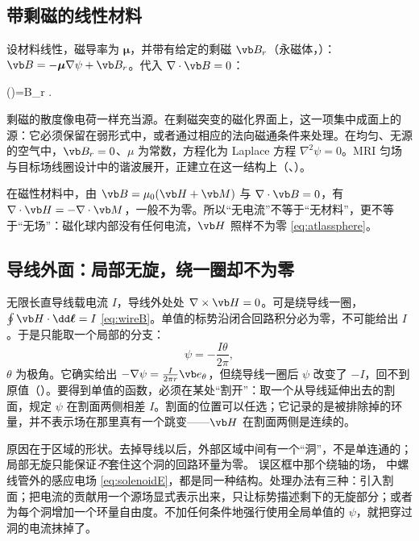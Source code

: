 \subsection{带剩磁的线性材料}
设材料线性，磁导率为 $\boldsymbol\mu$，并带有给定的剩磁 $\vb B_r$（永磁体，）：$\vb B=-\boldsymbol\mu\nabla\psi+\vb B_r$。代入 $\nabla\cdot\vb B=0$：
\begin{keyeq}
\nabla\cdot(\boldsymbol\mu\nabla\psi)=\nabla\cdot\vb B_r .
\label{eq:magscalar}
\end{keyeq}
剩磁的散度像电荷一样充当源。在剩磁突变的磁化界面上，这一项集中成面上的源：它必须保留在弱形式中，或者通过相应的法向磁通条件来处理。在均匀、无源的空气中，$\vb B_r=0$、$\mu$ 为常数，方程化为 Laplace 方程 $\nabla^2\psi=0$。MRI 匀场与目标场线圈设计中的谐波展开，正建立在这一结构上（、）。

在磁性材料中，由 $\vb B=\mu_0(\vb H+\vb M)$ 与 $\nabla\cdot\vb B=0$，有 $\nabla\cdot\vb H=-\nabla\cdot\vb M$，一般不为零。所以“无电流”不等于“无材料”，更不等于“无场”：磁化球内部没有任何电流，$\vb H$ 照样不为零 \eqref{eq:atlassphere}。

\subsection{导线外面：局部无旋，绕一圈却不为零}
无限长直导线载电流 $I$，导线外处处 $\nabla\times\vb H=0$。可是绕导线一圈，$\oint\vb H\cdot\dd\boldsymbol\ell=I$ \eqref{eq:wireB}。单值的标势沿闭合回路积分必为零，不可能给出 $I$。于是只能取一个局部的分支：
\begin{equation}
\psi=-\frac{I\theta}{2\pi},
\end{equation}
$\theta$ 为极角。它确实给出 $-\nabla\psi=\frac{I}{2\pi r}\vb e_\theta$，但绕导线一圈后 $\psi$ 改变了 $-I$，回不到原值（）。要得到单值的函数，必须在某处“割开”：取一个从导线延伸出去的割面，规定 $\psi$ 在割面两侧相差 $I$。割面的位置可以任选；它记录的是被排除掉的环量，并不表示场在那里真有一个跳变——$\vb H$ 在割面两侧是连续的。


原因在于区域的形状。去掉导线以后，外部区域中间有一个“洞”，不是单连通的；局部无旋只能保证\emph{不}套住这个洞的回路环量为零。 误区框中那个绕轴的场， 中螺线管外的感应电场 \eqref{eq:solenoidE}，都是同一种结构。处理办法有三种：引入割面；把电流的贡献用一个源场显式表示出来，只让标势描述剩下的无旋部分；或者为每个洞增加一个环量自由度。不加任何条件地强行使用全局单值的 $\psi$，就把穿过洞的电流抹掉了。

